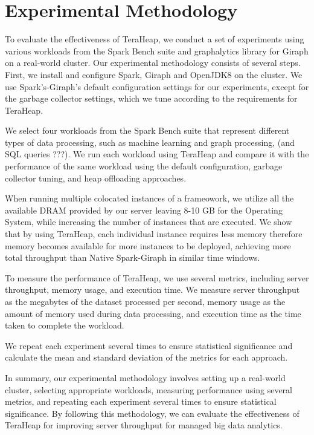 \section{Experimental Methodology}
\label{sec:method}

To evaluate the effectiveness of TeraHeap, we conduct a
set of experiments using various workloads from the Spark Bench suite
and graphalytics library for Giraph
on a real-world cluster. Our experimental methodology consists of
several steps. First, we install and configure Spark, Giraph and OpenJDK8 on the
cluster. We use Spark's-Giraph's default configuration settings for our
experiments, except for the garbage collector settings, which we tune
according to the requirements for TeraHeap.

We select four workloads from the Spark Bench suite that represent
different types of data processing, such as machine learning and graph
processing, (and SQL queries ???). We run each workload using TeraHeap
and compare it with the performance of the same
workload using the default configuration, garbage collector tuning,
and heap offloading approaches.

When running multiple colocated instances of a frameowork,
we utilize all the available DRAM provided by our server leaving 8-10
GB for the Operating System, while increasing the number of
instances that are executed. We show that by using TeraHeap, each
individual instance requires less memory therefore memory becomes
available for more instances to be deployed, achieving more total
throughput than Native Spark-Giraph in similar time windows.

To measure the performance of TeraHeap, we use several metrics,
including server throughput, memory usage, and execution time. We
measure server throughput as the megabytes of the dataset processed
per second, memory usage as the amount of memory used during data
processing, and execution time as the time taken to complete the
workload.

We repeat each experiment several times to ensure statistical
significance and calculate the mean and standard deviation of the
metrics for each approach.

In summary, our experimental methodology involves setting up a
real-world cluster, selecting appropriate workloads, measuring
performance using several metrics, and repeating each experiment
several times to ensure statistical significance. By following this
methodology, we can evaluate the effectiveness of TeraHeap
for improving server throughput for managed big data
analytics.


